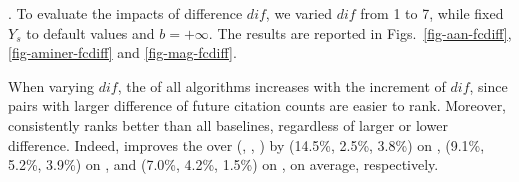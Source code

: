 

. %
To evaluate the impacts of %
difference $dif$, we varied $dif$ from 1 to 7, while fixed $Y_s$ to default values and $b=+\infty$. The results are reported in Figs.~\ref{fig-aan-fcdiff}, \ref{fig-aminer-fcdiff} and \ref{fig-mag-fcdiff}.


When varying $dif$, the \PairAcc of all algorithms increases with the increment of $dif$, since pairs with larger difference of future citation counts are easier to rank. Moreover, \ensemblerank consistently ranks better than all baselines, regardless of larger or lower difference. Indeed, \ensemblerank improves the \PairAcc over (\pagerank, \futurerank, \hhgrank) by (14.5\%, 2.5\%, 3.8\%) on \aan, (9.1\%, 5.2\%, 3.9\%) on \aminer, and (7.0\%, 4.2\%, 1.5\%) on \magdata, on average, respectively.




